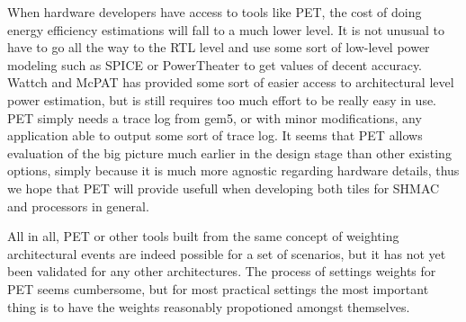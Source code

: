 When hardware developers have access to tools like PET, the cost of doing energy
efficiency estimations will fall to a much lower level. It is not unusual to
have to go all the way to the RTL level and use some sort of low-level power
modeling such as SPICE \cite{ponomarev2002accupower} or PowerTheater
\cite{bruno2005rtl} to get values of decent accuracy. Wattch and McPAT has
provided some sort of easier access to architectural level power estimation, but
is still requires too much effort to be really easy in use. PET simply needs a
trace log from gem5, or with minor modifications, any application able to output
some sort of trace log. It seems that PET allows evaluation of the big picture much
earlier in the design stage than other existing options, simply because it is much
more agnostic regarding hardware details, thus we hope that PET will provide usefull
when developing both tiles for SHMAC and processors in general.

All in all, PET or other tools built from the same concept of weighting architectural
events are indeed possible for a set of scenarios, but it has not yet been validated for
any other architectures. The process of settings weights for PET seems cumbersome, but
for most practical settings the most important thing is to have the weights reasonably
propotioned amongst themselves.
